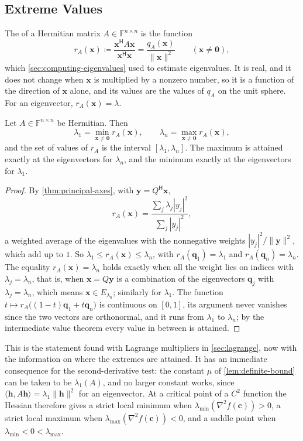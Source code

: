 \subsection{Extreme Values}

The  of a Hermitian matrix $A\in\mathbb F^{n\times n}$ is the function
\[
r_A(\mathbf x)\coloneqq\frac{\mathbf x^{\mathsf H}A\mathbf x}{\mathbf x^{\mathsf H}\mathbf x}=\frac{q_A(\mathbf x)}{\|\mathbf x\|^2}\qquad(\mathbf x\ne\mathbf 0),
\]
which \cref{sec:computing-eigenvalues} used to estimate eigenvalues. It is real, and it does not change when $\mathbf x$ is multiplied by a nonzero number, so it is a function of the direction of $\mathbf x$ alone, and its values are the values of $q_A$ on the unit sphere. For an eigenvector, $r_A(\mathbf x)=\lambda$.

\begin{theorem}
\label{thm:rayleigh}
Let $A\in\mathbb F^{n\times n}$ be Hermitian. Then
\[
\lambda_1=\min_{\mathbf x\ne\mathbf 0}r_A(\mathbf x),\qquad\lambda_n=\max_{\mathbf x\ne\mathbf 0}r_A(\mathbf x),
\]
and the set of values of $r_A$ is the interval $[\lambda_1,\lambda_n]$. The maximum is attained exactly at the eigenvectors for $\lambda_n$, and the minimum exactly at the eigenvectors for $\lambda_1$.
\end{theorem}

\begin{proof}
By \cref{thm:principal-axes}, with $\mathbf y=Q^{\mathsf H}\mathbf x$,
\[
r_A(\mathbf x)=\frac{\sum_j\lambda_j|y_j|^2}{\sum_j|y_j|^2},
\]
a weighted average of the eigenvalues with the nonnegative weights $|y_j|^2/\|\mathbf y\|^2$, which add up to $1$. So $\lambda_1\le r_A(\mathbf x)\le\lambda_n$, with $r_A(\mathbf q_1)=\lambda_1$ and $r_A(\mathbf q_n)=\lambda_n$. The equality $r_A(\mathbf x)=\lambda_n$ holds exactly when all the weight lies on indices with $\lambda_j=\lambda_n$, that is, when $\mathbf x=Q\mathbf y$ is a combination of the eigenvectors $\mathbf q_j$ with $\lambda_j=\lambda_n$, which means $\mathbf x\in E_{\lambda_n}$; similarly for $\lambda_1$. The function $t\mapsto r_A\bigl((1-t)\mathbf q_1+t\mathbf q_n\bigr)$ is continuous on $[0,1]$, its argument never vanishes since the two vectors are orthonormal, and it runs from $\lambda_1$ to $\lambda_n$; by the intermediate value theorem every value in between is attained.
\end{proof}

This is the statement found with Lagrange multipliers in \cref{sec:lagrange}, now with the information on where the extremes are attained. It has an immediate consequence for the second-derivative test: the constant $\mu$ of \cref{lem:definite-bound} can be taken to be $\lambda_1(A)$, and no larger constant works, since $\langle\mathbf h,A\mathbf h\rangle=\lambda_1\|\mathbf h\|^2$ for an eigenvector. At a critical point of a $C^2$ function the Hessian therefore gives a strict local minimum when $\lambda_{\min}(\nabla^2f(\mathbf c))>0$, a strict local maximum when $\lambda_{\max}(\nabla^2f(\mathbf c))<0$, and a saddle point when $\lambda_{\min}<0<\lambda_{\max}$.

